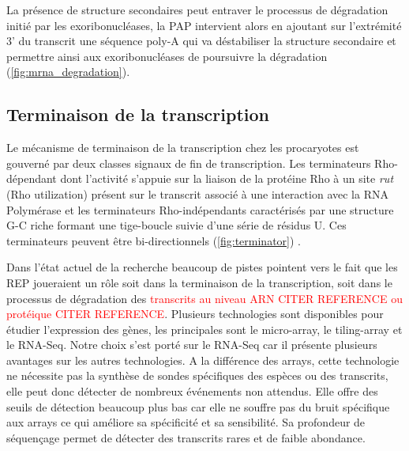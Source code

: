 \documentclass[12pt,a4paper]{report}
\begin{document}
\begin{onehalfspace}
La présence de structure secondaires peut entraver le processus de dégradation initié par les exoribonucléases, la PAP intervient alors en ajoutant sur l'extrémité 3' du transcrit une séquence poly-A qui va déstabiliser la structure secondaire et permettre ainsi aux exoribonucléases de poursuivre la dégradation (\autoref{fig:mrna_degradation}).

\subsection*{Terminaison de la transcription}
Le mécanisme de terminaison de la transcription chez les procaryotes est gouverné par deux classes signaux de fin de transcription. Les terminateurs Rho-dépendant dont l'activité s'appuie sur la liaison de la protéine Rho à un site \emph{rut} (Rho utilization) présent sur le transcrit associé à une interaction avec la RNA Polymérase et les terminateurs Rho-indépendants caractérisés par une structure G-C riche formant une tige-boucle suivie d'une série de résidus U. Ces terminateurs peuvent être bi-directionnels (\autoref{fig:terminator}) \citep{Henkin2000,Lesnik2001}.  

\begin{figure}
\end{figure}


\vspace{2.8cm}Dans l'état actuel de la recherche beaucoup de pistes pointent vers le fait que les REP joueraient un rôle soit dans la terminaison de la transcription, soit dans le processus de dégradation des \textcolor{red}{transcrits au niveau ARN CITER REFERENCE ou protéique CITER REFERENCE}. Plusieurs technologies sont disponibles pour étudier l'expression des gènes, les principales sont le micro-array, le \gls{tiling-array} et le \gls{RNA-Seq}. Notre choix s'est porté sur le RNA-Seq car il présente plusieurs avantages sur les autres technologies. A la différence des arrays, cette technologie ne nécessite pas la synthèse de sondes spécifiques des espèces ou des transcrits, elle peut donc détecter de nombreux événements non attendus. Elle offre des seuils de détection beaucoup plus bas car elle ne souffre pas du bruit spécifique aux arrays ce qui améliore sa spécificité et sa sensibilité. Sa profondeur de séquençage permet de détecter des transcrits rares et de faible abondance.


\end{onehalfspace}
\end{document}
